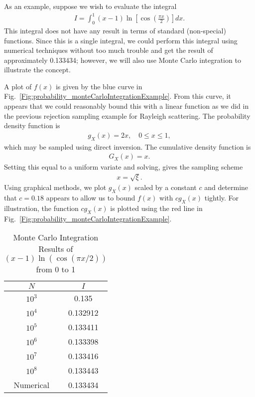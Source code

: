 As an example, suppose we wish to evaluate the integral
\begin{align}
  I = \int_0^1 ( x - 1 ) \ln \left[ \cos \left( \frac{\pi x}{2} \right) \right] dx.
\end{align}
This integral does not have any result in terms of standard (non-special) functions. Since this is a single integral, we could perform this integral using numerical techniques without too much trouble and get the result of approximately 0.133434; however, we will also use Monte Carlo integration to illustrate the concept. 

A plot of $f(x)$ is given by the blue curve in Fig.~\ref{Fig:probability_monteCarloIntegrationExample}. From this curve, it appears that we could reasonably bound this with a linear function as we did in the previous rejection sampling example for Rayleigh scattering. The probability density function is
\begin{align}
  g_X(x) = 2x, \quad 0 \le x \le 1 ,
\end{align}
which may be sampled using direct inversion. The cumulative density function is
\begin{align}
  G_X(x) = x.
\end{align}
Setting this equal to a uniform variate and solving, gives the sampling scheme
\begin{align}
  x = \sqrt{ \xi } .
\end{align}
Using graphical methods, we plot $g_X(x)$ scaled by a constant $c$ and determine that $c = 0.18$ appears to allow us to bound $f(x)$ with $c g_X(x)$ tightly. For illustration, the function $cg_X(x)$ is plotted using the red line in Fig.~\ref{Fig:probability_monteCarloIntegrationExample}.

\begin{table}[t!]
\caption{Monte Carlo Integration Results of $(x-1)\ln( \cos( \pi x / 2 ) )$ from 0 to 1}
\begin{center}
\begin{tabular}{|c|c|} \hline
$N$    & $I$      \\ \hline
$10^3$ & 0.135    \\
$10^4$ & 0.132912 \\
$10^5$ & 0.133411 \\
$10^6$ & 0.133398 \\
$10^7$ & 0.133416 \\
$10^8$ & 0.133443 \\ \hline
Numerical & 0.133434 \\ \hline
\end{tabular}
\end{center}
\label{Table:probability_monteCarloIntegrationExampleResults}
\end{table}%

